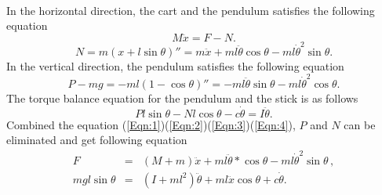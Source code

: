 \documentclass[a4paper,11pt]{article}
\begin{document}
\\
In the horizontal direction, the cart and the pendulum satisfies the following equation
\begin{equation}
	M \ddot{x} = F-N.	\label{Eqn:1}
\end{equation}
\begin{equation}
	N = m{(x+l\sin{\theta})}'' = m\ddot{x} + ml\ddot{\theta}\cos{\theta} - ml\dot{\theta}^2\sin{\theta}. \label{Eqn:2} 
\end{equation}
In the vertical direction, the pendulum satisfies the following equation
\begin{equation}
	P-mg = -ml(1-\cos{\theta})'' = -ml\ddot{\theta}\sin{\theta}-ml\dot{\theta}^2\cos{\theta}.	\label{Eqn:3}
\end{equation}
The torque balance equation for the pendulum and the stick is as follows
\begin{equation}
	Pl\sin{\theta}-Nl\cos{\theta} - c\dot{\theta} = I\ddot{\theta}.	\label{Eqn:4}
\end{equation}
Combined the equation (\ref{Eqn:1})(\ref{Eqn:2})(\ref{Eqn:3})(\ref{Eqn:4}), $P$ and $N$ can be eliminated and get following equation
\begin{eqnarray}
	F &=& (M+m)\ddot{x} + ml\ddot{\theta}*\cos{\theta} - ml\dot{\theta}^2\sin{\theta} \, , \nonumber \\ 
	mgl\sin{\theta} &=& (I+ml^2)\ddot{\theta} + ml\ddot{x}\cos{\theta} + c\dot{\theta}.
\end{eqnarray}
\end{document}
